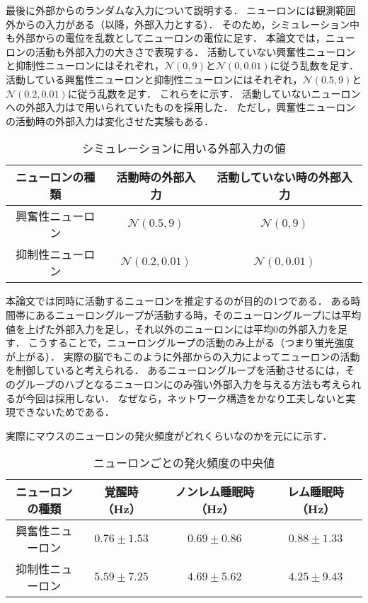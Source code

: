 最後に外部からのランダムな入力について説明する．
ニューロンには観測範囲外からの入力がある（以降，外部入力とする）．
そのため，シミュレーション中も外部からの電位を乱数としてニューロンの電位に足す．
本論文では，ニューロンの活動も外部入力の大きさで表現する．
活動していない興奮性ニューロンと抑制性ニューロンにはそれぞれ，$\mathcal{N}(0,9)$と$\mathcal{N}(0,0.01)$に従う乱数を足す．
活動している興奮性ニューロンと抑制性ニューロンにはそれぞれ，$\mathcal{N}(0.5, 9)$と$\mathcal{N}(0.2,0.01)$に従う乱数を足す．
これらをに示す．
活動していないニューロンへの外部入力は\cite{Izhikevich2003}で用いられていたものを採用した．
ただし，興奮性ニューロンの活動時の外部入力は変化させた実験もある．

\begin{table}[htb]
  \center
  \begin{tabular}{|c|cc|} \hline
    ニューロンの種類 & 活動時の外部入力 & 活動していない時の外部入力 \\ \hline
		興奮性ニューロン & $\mathcal{N}(0.5,9)$ & $\mathcal{N}(0, 9)$ \\
		抑制性ニューロン & $\mathcal{N}(0.2, 0.01)$ & $\mathcal{N}(0, 0.01)$ \\ \hline
  \end{tabular}
  \caption{シミュレーションに用いる外部入力の値}
  \label{tab:parameter3}
\end{table}

本論文では同時に活動するニューロンを推定するのが目的の1つである．
ある時間帯にあるニューロングループが活動する時，そのニューロングループには平均値を上げた外部入力を足し，それ以外のニューロンには平均$0$の外部入力を足す．
こうすることで，ニューロングループの活動のみ上がる（つまり蛍光強度が上がる）．
実際の脳でもこのように外部からの入力によってニューロンの活動を制御していると考えられる．
あるニューロングループを活動させるには，そのグループのハブとなるニューロンにのみ強い外部入力を与える方法も考えられるが今回は採用しない．
なぜなら，ネットワーク構造をかなり工夫しないと実現できないためである．

実際にマウスのニューロンの発火頻度がどれくらいなのか\cite{Watson2016}を元にに示す．
\begin{table}[htb]
  \center
  \begin{tabular}{|c|ccc|} \hline
    ニューロンの種類 & 覚醒時（Hz） & ノンレム睡眠時（Hz） & レム睡眠時（Hz） \\ \hline
		興奮性ニューロン & $0.76 \pm 1.53$ & $0.69 \pm 0.86$ & $0.88 \pm 1.33$ \\
		抑制性ニューロン & $5.59 \pm 7.25$ & $4.69 \pm 5.62$ & $4.25 \pm 9.43$ \\ \hline
  \end{tabular}
  \caption{ニューロンごとの発火頻度の中央値}
  \label{tab:spike-frequency}
\end{table}


